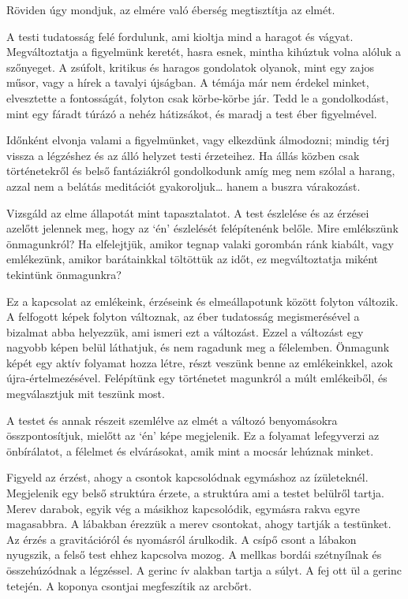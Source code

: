 Röviden úgy mondjuk, az elmére való éberség megtisztítja az elmét.

A testi tudatosság felé fordulunk, ami kioltja mind a haragot és vágyat.
Megváltoztatja a figyelmünk keretét, hasra esnek, mintha kihúztuk volna
alóluk a szőnyeget. A zsúfolt, kritikus és haragos gondolatok olyanok,
mint egy zajos műsor, vagy a hírek a tavalyi újságban. A témája már nem
érdekel minket, elvesztette a fontosságát, folyton csak körbe-körbe jár.
Tedd le a gondolkodást, mint egy fáradt túrázó a nehéz hátizsákot, és
maradj a test éber figyelmével.

Időnként elvonja valami a figyelmünket, vagy elkezdünk álmodozni; mindig
térj vissza a légzéshez és az álló helyzet testi érzeteihez. Ha állás
közben csak történetekről és belső fantáziákról gondolkodunk amíg meg
nem szólal a harang, azzal nem a belátás meditációt gyakoroljuk\ldots{}
hanem a buszra várakozást.

\clearpage


Vizsgáld az elme állapotát mint tapasztalatot. A test észlelése és az
érzései azelőtt jelennek meg, hogy az `én' észlelését felépítenénk
belőle. Mire emlékszünk önmagunkról? Ha elfelejtjük, amikor tegnap
valaki gorombán ránk kiabált, vagy emlékezünk, amikor barátainkkal
töltöttük az időt, ez megváltoztatja miként tekintünk önmagunkra?

Ez a kapcsolat az emlékeink, érzéseink és elmeállapotunk között folyton
változik. A felfogott képek folyton változnak, az éber tudatosság
megismerésével a bizalmat abba helyezzük, ami ismeri ezt a változást.
Ezzel a változást egy nagyobb képen belül láthatjuk, és nem ragadunk meg
a félelemben. Önmagunk képét egy aktív folyamat hozza létre, részt
veszünk benne az emlékeinkkel, azok újra-értelmezésével. Felépítünk egy
történetet magunkról a múlt emlékeiből, és megválasztjuk mit teszünk
most.


A testet és annak részeit szemlélve az elmét a változó benyomásokra
összpontosítjuk, mielőtt az `én' képe megjelenik. Ez a folyamat
lefegyverzi az önbírálatot, a félelmet és elvárásokat, amik mint a
mocsár lehúznak minket.

\enlargethispage*{\baselineskip}

Figyeld az érzést, ahogy a csontok kapcsolódnak egymáshoz az
ízületeknél. Megjelenik egy belső struktúra érzete, a struktúra ami a
testet belülről tartja. Merev darabok, egyik vég a másikhoz kapcsolódik,
egymásra rakva egyre magasabbra. A lábakban érezzük a merev csontokat,
ahogy tartják a testünket. Az érzés a gravitációról és nyomásról
árulkodik. A csípő csont a lábakon nyugszik, a felső test ehhez
kapcsolva mozog. A mellkas bordái szétnyílnak és összehúzódnak a
légzéssel. A gerinc ív alakban tartja a súlyt. A fej ott ül a gerinc
tetején. A koponya csontjai megfeszítik az arcbőrt.

